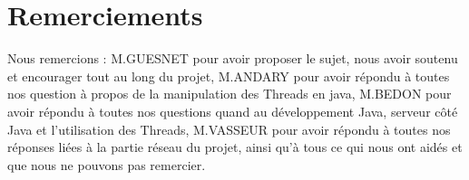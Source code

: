\section*{Remerciements}

Nous remercions : \newline
	M.GUESNET pour avoir proposer le sujet, nous avoir soutenu et encourager tout au long du projet,\newline
	M.ANDARY pour avoir répondu à toutes nos question à propos de la manipulation des Threads en java,\newline
	M.BEDON pour avoir répondu à toutes nos questions quand au développement Java, serveur côté Java et l'utilisation des Threads,\newline
	M.VASSEUR pour avoir répondu à toutes nos réponses liées à la partie réseau du projet,\newline
	ainsi qu'à tous ce qui nous ont aidés et que nous ne pouvons pas remercier.\newline